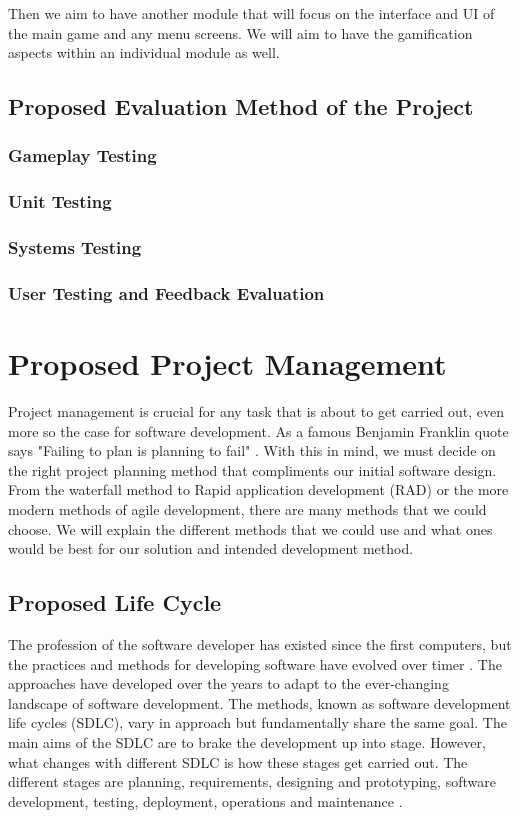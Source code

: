 \documentclass[a4paper,10pt]{article}
\begin{document}
Then we aim to have another module that will focus on the interface and UI of the main game and any menu screens. We will aim to have the gamification aspects within an individual module as well.

\subsection{Proposed Evaluation Method of the Project}
\subsubsection{Gameplay Testing}

\subsubsection{Unit Testing}

\subsubsection{Systems Testing}

\subsubsection{User Testing and Feedback Evaluation}



\section{Proposed Project Management}
Project management is crucial for any task that is about to get carried out, even more so the case for software development. As a famous Benjamin Franklin quote says "Failing to plan is planning to fail" \cite{plan_to_fail}. With this in mind, we must decide on the right project planning method that compliments our initial software design. From the waterfall method to Rapid application development (RAD) or the more modern methods of agile development, there are many methods that we could choose. We will explain the different methods that we could use and what ones would be best for our solution and intended development method.

\subsection{Proposed Life Cycle}
The profession of the software developer has existed since the first computers, but the practices and methods for developing software have evolved over timer \cite{SDLC}. The approaches have developed over the years to adapt to the ever-changing landscape of software development. The methods, known as software development life cycles (SDLC), vary in approach but fundamentally share the same goal. The main aims of the SDLC are to brake the development up into stage. However, what changes with different SDLC is how these stages get carried out. The different stages are planning, requirements, designing and prototyping, software development, testing, deployment, operations and maintenance \cite{SDLC}.
\end{document}
